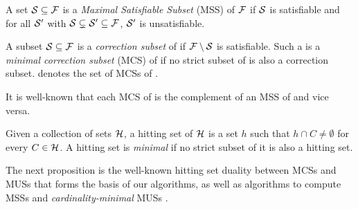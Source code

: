
\begin{definition}
    A set $\mathcal{S} \subseteq \mathcal{F} $ is a \emph{Maximal Satisfiable Subset} (MSS) of $ \mathcal{F} $ if $\mathcal{S}$ is satisfiable and for all $\mathcal{S}'$ with $\mathcal{S}  \subsetneq  \mathcal{S}'\subseteq\mathcal{F}  $, $\mathcal{S}'$ is unsatisfiable.
\end{definition}

\begin{definition}
    A subset $\mathcal{S} \subseteq \mathcal{F} $ is a \emph{correction subset} of \formula if $\mathcal{F} \setminus\mathcal{S}$ is satisfiable. 
    Such a  is a \emph{minimal correction subset} (MCS)  of \formula if no strict subset of  is also a correction subset. 
    \mcses{\F} denotes the set of MCSs of \F. 
\end{definition}

It is well-known that each  MCS of \formula is the complement of an MSS of \formula and vice versa.

\begin{definition}\label{def:minimal-hs}
    Given a collection of sets $\mathcal{H}$, a hitting set of $\mathcal{H}$ is a set $h$ such that  $h \cap C \neq \emptyset$ for every $C \in \mathcal{H}$. A hitting set is \emph{minimal} if no strict subset of it is also a hitting set.
\end{definition}



The next proposition is the well-known hitting set duality \cite{DBLP:journals/jar/LiffitonS08,ai/Reiter87}  between MCSs and MUSs that forms the basis of our algorithms, as well as algorithms to compute MSSs \citet{DBLP:conf/sat/DaviesB13} and \emph{cardinality-minimal} MUSs \cite{ignatiev2015smallest}.

